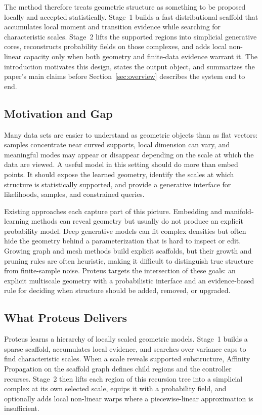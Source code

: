 \documentclass[11pt]{article}
\theoremstyle{definition}
\theoremstyle{plain}
\begin{document}
The method therefore treats geometric structure as something to be proposed locally and accepted statistically. Stage~1 builds a fast distributional scaffold that accumulates local moment and transition evidence while searching for characteristic scales. Stage~2 lifts the supported regions into simplicial generative cores, reconstructs probability fields on those complexes, and adds local non-linear capacity only when both geometry and finite-data evidence warrant it. The introduction motivates this design, states the output object, and summarizes the paper's main claims before Section~\ref{sec:overview} describes the system end to end.

\subsection{Motivation and Gap}
Many data sets are easier to understand as geometric objects than as flat vectors: samples concentrate near curved supports, local dimension can vary, and meaningful modes may appear or disappear depending on the scale at which the data are viewed. A useful model in this setting should do more than embed points. It should expose the learned geometry, identify the scales at which structure is statistically supported, and provide a generative interface for likelihoods, samples, and constrained queries.

Existing approaches each capture part of this picture. Embedding and manifold-learning methods can reveal geometry but usually do not produce an explicit probability model. Deep generative models can fit complex densities but often hide the geometry behind a parameterization that is hard to inspect or edit. Growing graph and mesh methods build explicit scaffolds, but their growth and pruning rules are often heuristic, making it difficult to distinguish true structure from finite-sample noise. Proteus targets the intersection of these goals: an explicit multiscale geometry with a probabilistic interface and an evidence-based rule for deciding when structure should be added, removed, or upgraded.

\subsection{What Proteus Delivers}
Proteus learns a hierarchy of locally scaled geometric models. Stage~1 builds a sparse scaffold, accumulates local evidence, and searches over variance caps to find characteristic scales. When a scale reveals supported substructure, Affinity Propagation on the scaffold graph defines child regions and the controller recurses. Stage~2 then lifts each region of this recursion tree into a simplicial complex at its own selected scale, equips it with a probability field, and optionally adds local non-linear warps where a piecewise-linear approximation is insufficient.
\end{document}
